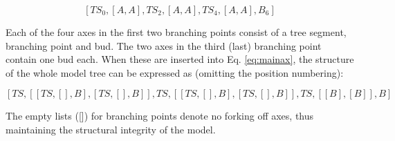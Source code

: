\begin{equation}\label{eq:mainax}
[TS_0,[A,A],TS_2,[A,A],TS_4,[A,A],B_6]
\end{equation}

Each of the  four axes in the first two branching  points consist of a
tree  segment, branching point  and bud.   The two  axes in  the third
(last) branching point  contain one bud each. When  these are inserted
into Eq.  \ref{eq:mainax},  the structure of the whole  model tree can
be expressed as (omitting the position numbering):

\begin{equation}\label{eq:tree}
[TS,[[TS,[],B],[TS,[],B]],TS,[[TS,[],B],[TS,[],B]],TS,[[B],[B]],B]
\end{equation}

The  empty lists ([]) for  branching points denote  no forking off
axes, thus maintaining the structural integrity of the model.

